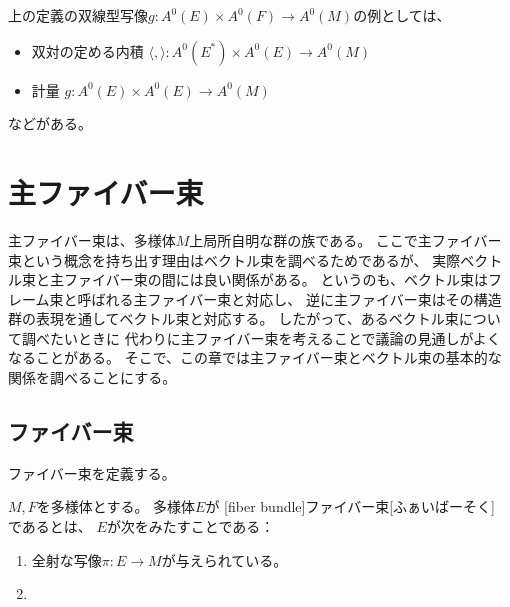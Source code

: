 \documentclass[report]{jlreq}
\begin{document}
\begin{remark}
    上の定義の双線型写像$g \colon A^0(E) \times A^0(F) \to A^0(M)$の例としては、
    \begin{itemize}
        \item 双対の定める内積
            $\langle , \rangle \colon A^0(E^*) \times A^0(E) \to A^0(M)$
        \item 計量
            $g \colon A^0(E) \times A^0(E) \to A^0(M)$
    \end{itemize}
    などがある。
\end{remark}



%
\newpage
\chapter{主ファイバー束}

主ファイバー束は、多様体$M$上局所自明な群の族である。
ここで主ファイバー束という概念を持ち出す理由はベクトル束を調べるためであるが、
実際ベクトル束と主ファイバー束の間には良い関係がある。
というのも、ベクトル束はフレーム束と呼ばれる主ファイバー束と対応し、
逆に主ファイバー束はその構造群の表現を通してベクトル束と対応する。
したがって、あるベクトル束について調べたいときに
代わりに主ファイバー束を考えることで議論の見通しがよくなることがある。
そこで、この章では主ファイバー束とベクトル束の基本的な関係を調べることにする。

%
\section{ファイバー束}

ファイバー束を定義する。


\begin{definition}[ファイバー束]
    $M, F$を多様体とする。
    多様体$E$が
    [fiber bundle]{ファイバー束}[ふぁいばーそく]
    であるとは、
    $E$が次をみたすことである：
    \begin{enumerate}
        \item 全射な{\smooth}写像$\pi \colon E \to M$が与えられている。
        \item {}
    \end{enumerate}
\end{definition}
\end{document}
